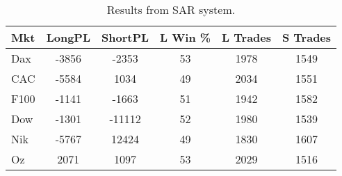 \begin{table}[ht]
\centering
\caption[SAR Base System]{Results from SAR system.} 
\label{tab:sar_results}
\begin{tabular}{lccccc}
  \toprule Mkt & LongPL & ShortPL & L Win \% & L Trades & S Trades \\ 
  \midrule Dax & -3856 & -2353 & 53 & 1978 & 1549 \\ 
  CAC & -5584 & 1034 & 49 & 2034 & 1551 \\ 
  F100 & -1141 & -1663 & 51 & 1942 & 1582 \\ 
  Dow & -1301 & -11112 & 52 & 1980 & 1539 \\ 
  Nik & -5767 & 12424 & 49 & 1830 & 1607 \\ 
  Oz & 2071 & 1097 & 53 & 2029 & 1516 \\ 
   \bottomrule \end{tabular}
\end{table}
